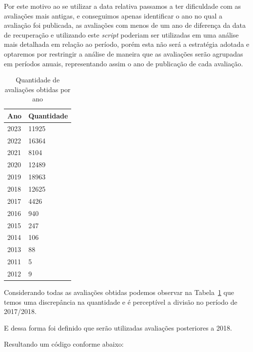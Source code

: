 Por este motivo ao se utilizar a data relativa passamos a ter dificuldade com as avaliações mais antigas, e conseguimos apenas identificar o ano no qual a avaliação foi publicada, as avaliações com menos de um ano de diferença da data de recuperação e utilizando este \textit{script} poderiam ser utilizadas em uma análise mais detalhada em relação ao período, porém esta não será a estratégia adotada e optaremos por restringir a análise de maneira que as avaliações serão agrupadas em períodos anuais, representando assim o ano de publicação de cada avaliação.

\begin{table}[]
	\centering
	\begin{tabular}{|l|l|}
		\hline
		\textbf{Ano} & \textbf{Quantidade} \\\hline
		2023         & 11925               \\
		2022         & 16364               \\
		2021         & 8104                \\
		2020         & 12489               \\
		2019         & 18963               \\
		2018         & 12625               \\
		2017         & 4426                \\
		2016         & 940                 \\
		2015         & 247                 \\
		2014         & 106                 \\
		2013         & 88                  \\
		2011         & 5                   \\
		2012         & 9                   \\
		\hline
	\end{tabular}%
	\caption{Quantidade de avaliações obtidas por ano}
	\label{table:review_per_year}
\end{table}

Considerando todas as avaliações obtidas podemos observar na Tabela~\ref{table:review_per_year} que temos uma discrepância na quantidade e é perceptível a divisão no período de 2017/2018.

E dessa forma foi definido que serão utilizadas avaliações posteriores a 2018.

Resultando um código conforme abaixo:



